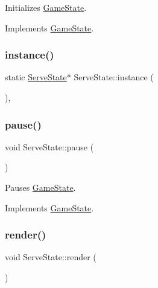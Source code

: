 Initializes \mbox{\hyperlink{class_game_state}{Game\+State}}. 



Implements \mbox{\hyperlink{class_game_state_a10b6e6bb31591c70d08ffcee5f29fa81}{Game\+State}}.

\mbox{\label{class_serve_state_ac0f3ead67813e13e2a84026162da3b7c}} 
\subsubsection{\texorpdfstring{instance()}{instance()}}
{\footnotesize\ttfamily static \mbox{\hyperlink{class_serve_state}{Serve\+State}}$\ast$ Serve\+State\+::instance (\begin{DoxyParamCaption}{ }\end{DoxyParamCaption})\hspace{0.3cm}{\ttfamily [inline]}, {\ttfamily [static]}}

\mbox{\label{class_serve_state_ab3a85411b4cc260cfede50e3aa10573c}} 
\subsubsection{\texorpdfstring{pause()}{pause()}}
{\footnotesize\ttfamily void Serve\+State\+::pause (\begin{DoxyParamCaption}{ }\end{DoxyParamCaption})\hspace{0.3cm}{\ttfamily [virtual]}}



Pauses \mbox{\hyperlink{class_game_state}{Game\+State}}. 



Implements \mbox{\hyperlink{class_game_state_aafc908582760099891b37bb380ddd87a}{Game\+State}}.

\mbox{\label{class_serve_state_a91cd889069e5b9f073ac33addeed2913}} 
\subsubsection{\texorpdfstring{render()}{render()}}
{\footnotesize\ttfamily void Serve\+State\+::render (\begin{DoxyParamCaption}\item[{\mbox{\hyperlink{class_game_engine}{Game\+Engine}} $\ast$}]{ }\end{DoxyParamCaption})\hspace{0.3cm}{\ttfamily [virtual]}}



